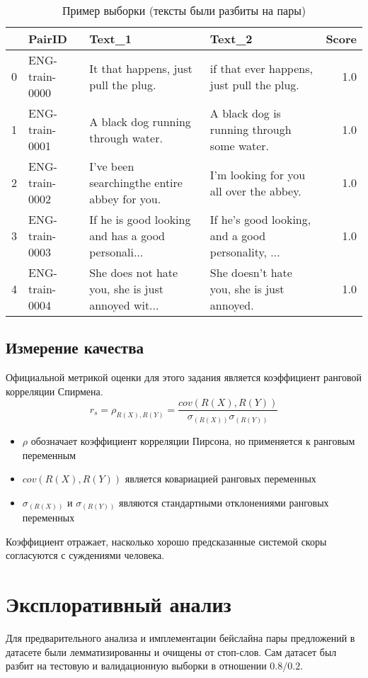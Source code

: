 \documentclass[12pt]{article}
\begin{document}
\begin{table}[H]
\center
\tiny
\begin{tabular}{llllr}
\hline
{} &          PairID &                                             Text\_1 &                                             Text\_2 &  Score \\
\hline
0 &  ENG-train-0000 &               It that happens, just pull the plug. &          if that ever happens, just pull the plug. &    1.0 \\
1 &  ENG-train-0001 &                 A black dog running through water. &         A black dog is running through some water. &    1.0 \\
2 &  ENG-train-0002 &       I've been searchingthe entire abbey for you. &            I'm looking for you all over the abbey. &    1.0 \\
3 &  ENG-train-0003 &  If he is good looking and has a good personali... &  If he's good looking, and a good personality, ... &    1.0 \\
4 &  ENG-train-0004 &  She does not hate you, she is just annoyed wit... &         She doesn't hate you, she is just annoyed. &    1.0 \\
\hline
\end{tabular}
\caption{Пример выборки (тексты были разбиты на пары)}
\end{table}

\subsection{Измерение качества}
Официальной метрикой оценки для этого задания является коэффициент ранговой корреляции Спирмена.
$$
r_s = \rho_{R(X), R(Y)} = \frac{cov(R(X), R(Y))}{\sigma_{(R(X))} \sigma_{(R(Y))}}
$$
\begin{itemize}
    \item $\rho$ обозначает коэффициент корреляции Пирсона, но применяется к ранговым переменным
    \item $cov(R(X), R(Y))$ является ковариацией ранговых переменных
    \item $\sigma_{(R(X))}$ и $\sigma_{(R(Y))}$ являются стандартными отклонениями ранговых переменных
\end{itemize}
Коэффициент отражает, насколько хорошо предсказанные системой скоры согласуются с суждениями человека.

\newpage

\section{Эксплоративный анализ}
Для предварительного анализа и имплементации бейслайна пары предложений в датасете были лемматизированны и очищены от стоп-слов. Сам датасет был разбит на тестовую и валидационную выборки в отношении $0.8 / 0.2$.
\end{document}
